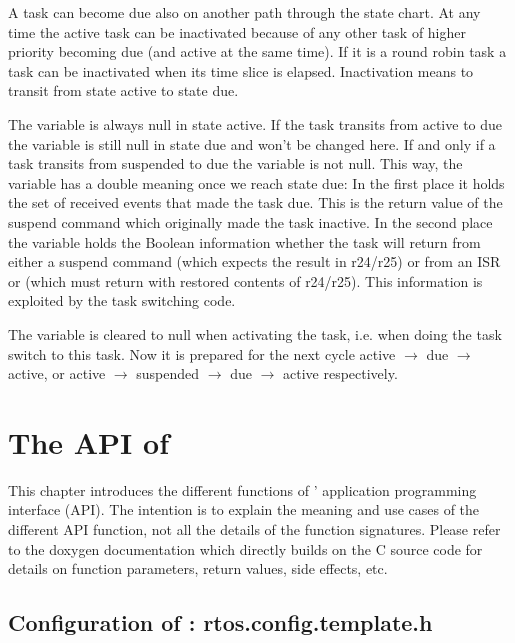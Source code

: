 A task can become due also on another path through the state chart. At any
time the active task can be inactivated because of any other task of
higher priority becoming due (and active at the same time). If it is a
round robin task a task can be inactivated when its time slice is
elapsed. Inactivation means to transit from state active to state due.

The variable  is always null in state active. If the
task transits from active to due the variable is still null in state due
and won't be changed here. If and only if a task transits from suspended
to due the variable is not null. This way, the variable has a double
meaning once we reach state due: In the first place it holds the set of
received events that made the task due. This is the return value of the
suspend command which originally made the task inactive. In the second
place the variable holds the Boolean information whether the task will
return from either a suspend command (which expects the result in r24/r25)
or from an ISR or  (which must return with restored
contents of r24/r25). This information is exploited by the task switching
code.

The variable  is cleared to null when activating the
task, i.e. when doing the task switch to this task. Now it is prepared for
the next cycle active $\rightarrow$ due $\rightarrow$ active, or active
$\rightarrow$ suspended $\rightarrow$ due $\rightarrow$ active
respectively.


\chapter{The API of \rtos}
\label{secAPI}

This chapter introduces the different functions of \rtos' application
programming interface (API). The intention is to explain the meaning and
use cases of the different API function, not all the details of the
function signatures. Please refer to the doxygen documentation which
directly builds on the C source code for details on function parameters,
return values, side effects, etc.


\section{Configuration of \rtos: rtos.config.template.h}

